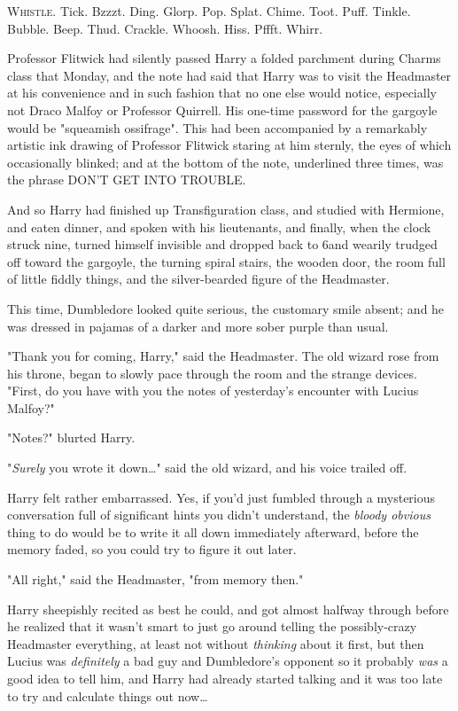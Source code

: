 
\lettrine{W}{histle}. Tick.
Bzzzt. Ding. Glorp. Pop. Splat. Chime. Toot. Puff. Tinkle. Bubble. Beep. Thud.
Crackle. Whoosh. Hiss. Pffft. Whirr.

Professor Flitwick had silently passed Harry a folded parchment during Charms
class that Monday, and the note had said that Harry was to visit the Headmaster
at his convenience and in such fashion that no one else would notice,
especially not Draco Malfoy or Professor Quirrell. His one-time password for
the gargoyle would be "squeamish ossifrage". This had been accompanied by a
remarkably artistic ink drawing of Professor Flitwick staring at him sternly,
the eyes of which occasionally blinked; and at the bottom of the note,
underlined three times, was the phrase DON'T GET INTO TROUBLE.

And so Harry had finished up Transfiguration class, and studied with Hermione,
and eaten dinner, and spoken with his lieutenants, and finally, when the clock
struck nine, turned himself invisible and dropped back to 6\PM and wearily
trudged off toward the gargoyle, the turning spiral stairs, the wooden door,
the room full of little fiddly things, and the silver-bearded figure of the
Headmaster.

This time, Dumbledore looked quite serious, the customary smile absent; and he
was dressed in pajamas of a darker and more sober purple than usual.

"Thank you for coming, Harry," said the Headmaster. The old wizard rose from
his throne, began to slowly pace through the room and the strange devices.
"First, do you have with you the notes of yesterday's encounter with Lucius
Malfoy?"

"Notes?" blurted Harry.

"\emph{Surely} you wrote it down{\ldots}" said the old wizard, and his voice
trailed off.

Harry felt rather embarrassed. Yes, if you'd just fumbled through a mysterious
conversation full of significant hints you didn't understand, the \emph{bloody
obvious} thing to do would be to write it all down immediately afterward,
before the memory faded, so you could try to figure it out later.

"All right," said the Headmaster, "from memory then."

Harry sheepishly recited as best he could, and got almost halfway through
before he realized that it wasn't smart to just go around telling the
possibly-crazy Headmaster everything, at least not without \emph{thinking}
about it first, but then Lucius was \emph{definitely} a bad guy and
Dumbledore's opponent so it probably \emph{was} a good idea to tell him, and
Harry had already started talking and it was too late to try and calculate
things out now{\ldots}

